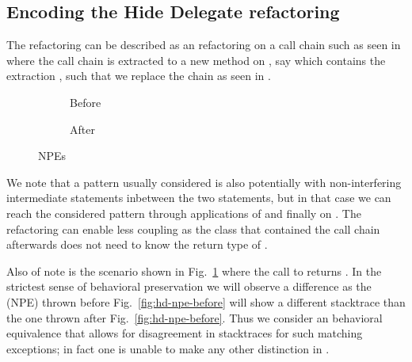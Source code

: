 \subsection{Encoding the Hide Delegate refactoring}\label{sec:hideDelegate}

The  refactoring can be described as an  refactoring on a call chain such as seen in 
where the call chain is extracted to a new method on , say  which contains the extraction , such that we replace the chain as seen in .

\begin{figure}[tbp]
  \centering
  \begin{subfigure}{.3\linewidth}
    
    \caption{Before}
  \end{subfigure}
  \begin{subfigure}{.3\linewidth}
    
    \caption{After}
  \end{subfigure}
  \caption{NPEs}
  \label{fig:NPEs}
\end{figure}

We note that a pattern usually considered is also  potentially with non-interfering intermediate statements inbetween the two statements,
but in that case we can reach the considered pattern through applications of  and finally  on .
The refactoring can enable less coupling as the class that contained the call chain afterwards does not need to know the return type of .

Also of note is the scenario shown in Fig.~\ref{fig:NPEs} where the call to  returns . In the strictest sense of behavioral preservation
we will observe a difference as the  (NPE) thrown before Fig.~\ref{fig:hd-npe-before} will show a different stacktrace than the one thrown after Fig.~\ref{fig:hd-npe-before}.
Thus we consider an behavioral equivalence that allows for disagreement in stacktraces for such matching exceptions; in fact one is unable to make any other distinction in \Refinity{}.


